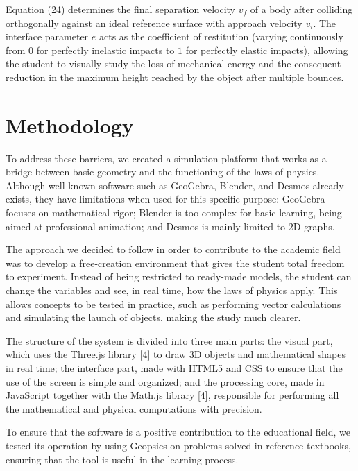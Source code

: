 \documentclass[conference,a4paper]{IEEEtran}
\begin{document}
Equation (24) determines the final separation velocity $v_f$ of a body after colliding orthogonally against an ideal reference surface with approach velocity $v_i$. The interface parameter $e$ acts as the coefficient of restitution (varying continuously from $0$ for perfectly inelastic impacts to $1$ for perfectly elastic impacts), allowing the student to visually study the loss of mechanical energy and the consequent reduction in the maximum height reached by the object after multiple bounces.

\section{Methodology}

To address these barriers, we created a simulation platform that works as a bridge between basic geometry and the functioning of the laws of physics. Although well-known software such as GeoGebra, Blender, and Desmos already exists, they have limitations when used for this specific purpose: GeoGebra focuses on mathematical rigor; Blender is too complex for basic learning, being aimed at professional animation; and Desmos is mainly limited to 2D graphs.

The approach we decided to follow in order to contribute to the academic field was to develop a free-creation environment that gives the student total freedom to experiment. Instead of being restricted to ready-made models, the student can change the variables and see, in real time, how the laws of physics apply. This allows concepts to be tested in practice, such as performing vector calculations and simulating the launch of objects, making the study much clearer.

The structure of the system is divided into three main parts: the visual part, which uses the Three.js library [4] to draw 3D objects and mathematical shapes in real time; the interface part, made with HTML5 and CSS to ensure that the use of the screen is simple and organized; and the processing core, made in JavaScript together with the Math.js library [4], responsible for performing all the mathematical and physical computations with precision.

To ensure that the software is a positive contribution to the educational field, we tested its operation by using Geopsics on problems solved in reference textbooks, ensuring that the tool is useful in the learning process.

\end{document}
